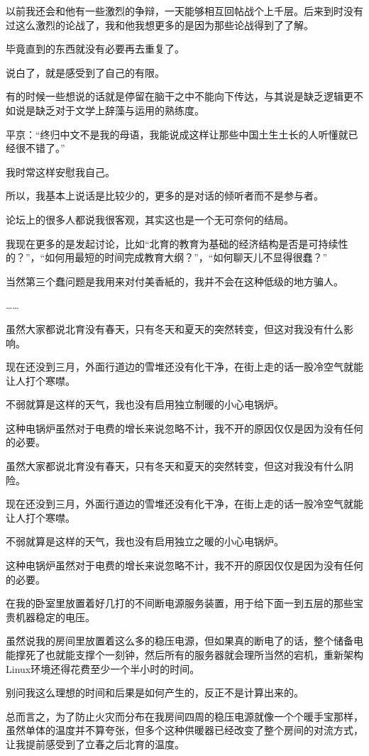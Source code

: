 以前我还会和他有一些激烈的争辩，一天能够相互回帖战个上千层。后来到时没有过这么激烈的论战了，我和他我想更多的是因为那些论战得到了了解。

毕竟直到的东西就没有必要再去重复了。

说白了，就是感受到了自己的有限。

有的时候一些想说的话就是停留在脑干之中不能向下传达，与其说是缺乏逻辑更不如说是缺乏对于文学上辞藻与运用的熟练度。

平京：“终归中文不是我的母语，我能说成这样让那些中国土生土长的人听懂就已经很不错了。”

我时常这样安慰我自己。

所以，我基本上说话是比较少的，更多的是对话的倾听者而不是参与者。

论坛上的很多人都说我很客观，其实这也是一个无可奈何的结局。

我现在更多的是发起讨论，比如“北育的教育为基础的经济结构是否是可持续性的？”，“如何用最短的时间完成教育大纲？”，“如何聊天儿不显得很蠢？”

当然第三个蠢问题是我用来对付美香紙的，我并不会在这种低级的地方骗人。

……


虽然大家都说北育没有春天，只有冬天和夏天的突然转变，但这对我没有什么影响。

现在还没到三月，外面行道边的雪堆还没有化干净，在街上走的话一股冷空气就能让人打个寒噤。

不弱就算是这样的天气，我也没有启用独立制暖的小心电锅炉。

这种电锅炉虽然对于电费的增长来说忽略不计，我不开的原因仅仅是因为没有任何的必要。


虽然大家都说北育没有春天，只有冬天和夏天的突然转变，但这对我没有什么阴险。

现在还没到三月，外面行道边的雪堆还没有化干净，在街上走的话一股冷空气就能让人打个寒噤。

不弱就算是这样的天气，我也没有启用独立之暖的小心电锅炉。

这种电锅炉虽然对于电费的增长来说忽略不计，我不开的原因仅仅是因为没有任何的必要。

在我的卧室里放置着好几打的不间断电源服务装置，用于给下面一到五层的那些宝贵机器稳定的电压。

虽然说我的房间里放置着这么多的稳压电源，但如果真的断电了的话，整个储备电能撑死了也就能支撑个一刻钟，然后所有的服务器就会理所当然的宕机，重新架构Linux环境还得花费至少一个半小时的时间。

别问我这么理想的时间和后果是如何产生的，反正不是计算出来的。

总而言之，为了防止火灾而分布在我房间四周的稳压电源就像一个个暖手宝那样，虽然单体的温度并不算夸张，但多个这种供暖器已经改变了整个房间的对流方式，让我提前感受到了立春之后北育的温度。

